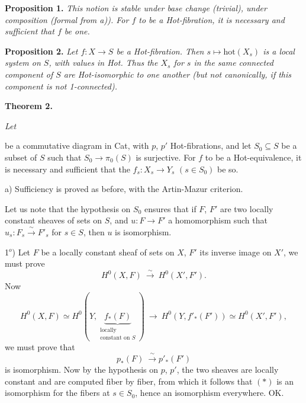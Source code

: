 
\textbf{Proposition 1.} \textit{This notion is stable under base change (trivial), under composition (formal from a)). For $f$ to be a \textup{Hot}-fibration, it is necessary and sufficient that $f$ be one.}

\textbf{Proposition 2.} \textit{Let $f : X \longrightarrow S$ be a \textup{Hot}-fibration. Then $s \longmapsto \mathrm{hot}(X_s)$ is a local system on $S$, with values in \textup{Hot}. Thus the $X_s$ for $s$ in the same connected component of $S$ are \textup{Hot}-isomorphic to one another (but not canonically, if this component is not \textup{1}-connected).}

\textbf{Theorem 2.} {\itshape Let
be a commutative diagram in \textup{Cat}, with $p$, $p'$ \textup{Hot}-fibrations, and let $S_0 \subseteq S$ be a subset of $S$ such that $S_0 \longrightarrow \pi_0(S)$ is surjective. For $f$ to be a \textup{Hot}-equivalence, it is necessary and sufficient that the $f_s : X_s \longrightarrow Y_s$ $(s \in S_0)$ be so.} %

a) Sufficiency is proved as before, with the Artin-Mazur criterion.


Let us note that the hypothesis on $S_0$ ensures that if $F$, $F'$ are two locally constant sheaves of sets on $S$, and $u : F \longrightarrow F'$ a homomorphism such that $u_s : F_s \xrightarrow{\ \sim\ } F'_s$ for $s \in S$, then $u$ is isomorphism. %

1$^{o}$) Let $F$ be a locally constant sheaf of sets on $X$, $F'$ its inverse image on $X'$, we must prove
\[
H^0(X,F) \ \xrightarrow{\ \sim\ }\ H^0(X',F').
\]
Now
\[
H^0(X,F) \simeq H^0(Y, \underbrace{f_*(F)}_{\substack{\text{locally}\\ \text{constant on } S}}) \ \longrightarrow\ H^0(Y, f'_*(F')) \simeq H^0(X',F'),
\] %
we must prove that
\[
p_*(F) \ \xrightarrow{\ \sim\ } p'_*(F') \tag*{$(*)$}
\]
is isomorphism. Now by the hypothesis on $p$, $p'$, the two sheaves are locally constant and are computed fiber by fiber, from which it follows that $(*)$ is an isomorphism for the fibers at $s \in S_0$, hence an isomorphism everywhere. OK.

